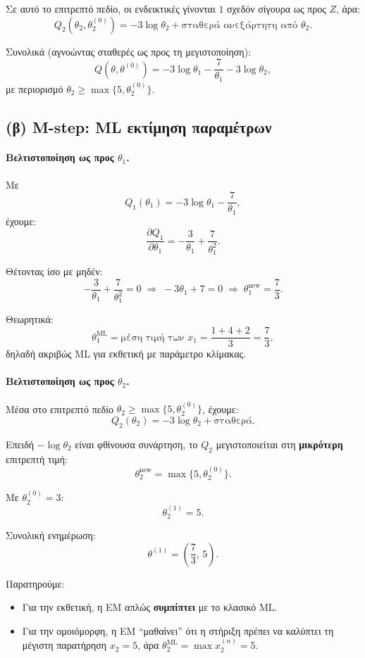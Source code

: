 \documentclass[a4paper,11pt]{article}
\begin{document}
Σε αυτό το επιτρεπτό πεδίο, οι ενδεικτικές γίνονται $1$ σχεδόν σίγουρα
ως προς $Z$, άρα:
\[
Q_2(\theta_2,\theta_2^{(0)})
= -3\log\theta_2 + \text{σταθερά ανεξάρτητη από }\theta_2.
\]

Συνολικά (αγνοώντας σταθερές ως προς τη μεγιστοποίηση):
\[
Q(\theta,\theta^{(0)})
= -3\log\theta_1 - \frac{7}{\theta_1}
  - 3\log\theta_2,
\]
με περιορισμό $\theta_2 \ge \max\{5,\theta_2^{(0)}\}$.

\subsection{(β) M-step: ML εκτίμηση παραμέτρων}

\paragraph{Βελτιστοποίηση ως προς $\theta_1$.}

Με
\[
Q_1(\theta_1) = -3\log\theta_1 - \frac{7}{\theta_1},
\]
έχουμε:
\[
\frac{\partial Q_1}{\partial \theta_1}
= -\frac{3}{\theta_1} + \frac{7}{\theta_1^2}.
\]

Θέτοντας ίσο με μηδέν:
\[
-\frac{3}{\theta_1} + \frac{7}{\theta_1^2} = 0
\;\Rightarrow\;
-3\theta_1 + 7 = 0
\;\Rightarrow\;
\boxed{\theta_1^{\text{new}} = \frac{7}{3}.}
\]

Θεωρητικά:
\[
\theta_1^{\text{ML}} = \text{μέση τιμή των }x_1
= \frac{1+4+2}{3} = \frac{7}{3},
\]
δηλαδή ακριβώς ML για εκθετική με παράμετρο κλίμακας.

\paragraph{Βελτιστοποίηση ως προς $\theta_2$.}

Μέσα στο επιτρεπτό πεδίο $\theta_2 \ge \max\{5,\theta_2^{(0)}\}$,
έχουμε:
\[
Q_2(\theta_2) = -3\log\theta_2 + \text{σταθερά}.
\]

Επειδή $-\log\theta_2$ είναι φθίνουσα συνάρτηση, το $Q_2$ μεγιστοποιείται
στη \textbf{μικρότερη} επιτρεπτή τιμή:
\[
\boxed{\theta_2^{\text{new}} = \max\{5,\theta_2^{(0)}\}.}
\]

Με $\theta_2^{(0)} = 3$:
\[
\boxed{\theta_2^{(1)} = 5.}
\]

Συνολική ενημέρωση:
\[
\theta^{(1)} = \left(\frac{7}{3},\, 5\right).
\]

Παρατηρούμε:

\begin{itemize}
  \item Για την εκθετική, η EM απλώς \textbf{συμπίπτει} με το κλασικό ML.
  \item Για την ομοιόμορφη, η EM ``μαθαίνει'' ότι η στήριξη πρέπει
        να καλύπτει τη μέγιστη παρατήρηση $x_2=5$, άρα
        $\theta_2^{\text{ML}} = \max x_2^{(n)} = 5$.
\end{itemize}
\end{document}
